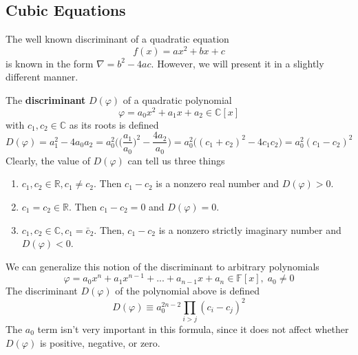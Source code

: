 \subsection{Cubic Equations}

  The well known discriminant of a quadratic equation 
  \begin{equation}
    f(x) = ax^2 + bx + c
  \end{equation}
  is known in the form $\nabla = b^2 - 4ac$. However, we will present it in a slightly different manner. 

  \begin{definition}
    The \textbf{discriminant} $D(\varphi)$ of a quadratic polynomial
    \begin{equation}
      \varphi = a_0 x^2 + a_1 x + a_2 \in \mathbb{C}[x]
    \end{equation}
    with $c_1, c_2 \in \mathbb{C}$ as its roots is defined
    \begin{equation}
      D(\varphi) = a_1^2 - 4 a_0 a_2 = a_0^2 \bigg( \Big(\frac{a_1}{a_0} \Big)^2 - \frac{4 a_2}{a_0} \bigg) = a_0^2 \big( (c_1 + c_2)^2 - 4 c_1 c_2 \big) = a_0^2 (c_1 - c_2)^2
    \end{equation}
    Clearly, the value of $D(\varphi)$ can tell us three things
    \begin{enumerate}
      \item $c_1, c_2 \in \mathbb{R}, c_1 \neq c_2$. Then $c_1 - c_2$ is a nonzero real number and $D(\varphi) > 0$. 
      \item $c_1 = c_2 \in \mathbb{R}$. Then $c_1 - c_2 = 0$ and $D(\varphi) = 0$. 
      \item $c_1, c_2 \in \mathbb{C}, c_1 = \bar{c}_2$. Then, $c_1 - c_2$ is a nonzero strictly imaginary number and $D(\varphi) < 0$. 
    \end{enumerate}
  \end{definition}

  \begin{definition}
    We can generalize this notion of the discriminant to arbitrary polynomials
    \begin{equation}
      \varphi = a_0 x^n + a_1 x^{n-1} + ... + a_{n-1} x + a_n \in \mathbb{F}[x], \; a_0 \neq 0
    \end{equation}
    The discriminant $D(\varphi)$ of the polynomial above is defined
    \begin{equation}
      D(\varphi) \equiv a_0^{2n-2} \prod_{i>j} (c_i - c_j)^2
    \end{equation}
    The $a_0$ term isn't very important in this formula, since it does not affect whether $D(\varphi)$ is positive, negative, or zero. 
  \end{definition}

